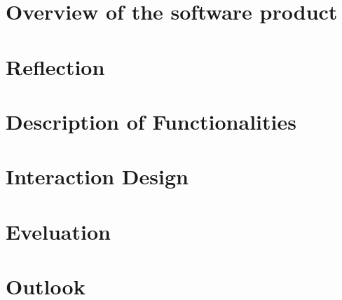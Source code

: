 \chapter{Overview of the software product}

\chapter{Reflection}

\chapter{Description of Functionalities}

\chapter{Interaction Design}

\chapter{Eveluation}

\chapter{Outlook}